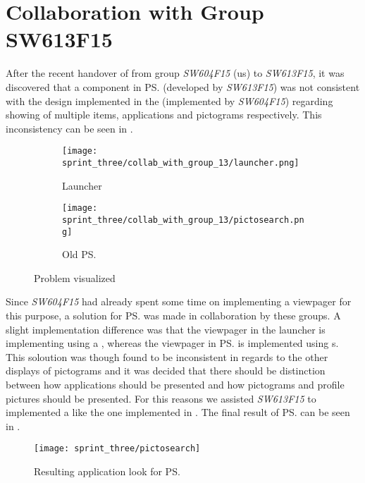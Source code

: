 
\section{Collaboration with Group SW613F15}
\label{sec:collaboration_with_group_sw613f15}

After the recent handover of \gc from group \emph{SW604F15} (us) to \emph{SW613F15}, it was discovered that a component in \ps (developed by \emph{SW613F15}) was not consistent with the design implemented in the \launcher (implemented by \emph{SW604F15}) regarding showing of multiple items, applications and pictograms respectively. This inconsistency can be seen in .

\begin{figure}[!htbp]
    \centering

    \begin{subfigure}[t]{0.75\textwidth}
        \texttt{[image: sprint\_three/collab\_with\_group\_13/launcher.png]}
        \caption{Launcher}
        \label{fig:collab_with_group_13_launhcer}
        \vspace*{1cm}
    \end{subfigure}
    \hfill
    \begin{subfigure}[t]{0.75\textwidth}
        \texttt{[image: sprint\_three/collab\_with\_group\_13/pictosearch.png]}
        \caption{Old \ps}
        \label{fig:collab_with_group_13_pictosearch}
    \end{subfigure}
    
    \caption{Problem visualized}
    \label{fig:collab_with_group_13}
\end{figure}

Since \emph{SW604F15} had already spent some time on implementing a viewpager for this purpose, a solution for \ps was made in collaboration by these groups. A slight implementation difference was that the viewpager in the launcher is implementing using a , whereas the viewpager in \ps is implemented using s. This soloution was though found to be inconsistent in regards to the other displays of pictograms and it was decided that there should be distinction between how applications should be presented and how pictograms and profile pictures should be presented. For this reasons we assisted \emph{SW613F15} to implemented a  like the one implemented in \ct. The final result of \ps can be seen in .


\begin{figure}[!htbp]
    \centering
    \texttt{[image: sprint\_three/pictosearch]}
    \caption{Resulting application look for \ps}
    \label{fig:pictosearch}
\end{figure}